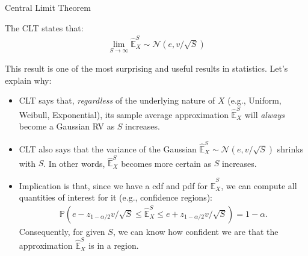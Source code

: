 \documentclass[9pt]{beamer}
\begin{document}
%
\begin{frame}{Central Limit Theorem}

\begin{block}{}
The CLT states that:
\begin{align*}
\lim_{S\to \infty}\hat{\mathbb{E}}_X^S\sim \mathcal{N}(e,v/\sqrt{S})
\end{align*}
\end{block}

This result is one of the most surprising and useful results in statistics. Let's explain why:

\begin{itemize}

\item CLT says that, {\em regardless} of the underlying nature of $X$ (e.g., Uniform, Weibull, Exponential), its sample average approximation $\hat{\mathbb{E}}_X^S$ will {\em always} become a Gaussian RV as $S$ increases.  

\item CLT also says that the variance of the Gaussian $\hat{\mathbb{E}}_X^S\sim \mathcal{N}(e,v/\sqrt{S})$ shrinks with $S$. In other words, $\hat{\mathbb{E}}_X^S$ becomes more certain as $S$ increases.

\item Implication is that, since we have a cdf and pdf for $\hat{\mathbb{E}}_X^S$, we can compute all quantities of interest for it (e.g., confidence regions):
\begin{align*}
\mathbb{P}\left(e-z_{1-\alpha/2}v/\sqrt{S}\leq \hat{\mathbb{E}}_X^S\leq e+z_{1-\alpha/2}v/\sqrt{S}\right)=1-\alpha.
\end{align*}
Consequently, for given $S$, we can know how confident we are that the approximation $\hat{\mathbb{E}}_X^S$ is in a region.  

\end{itemize}


\end{frame}
\end{document}
